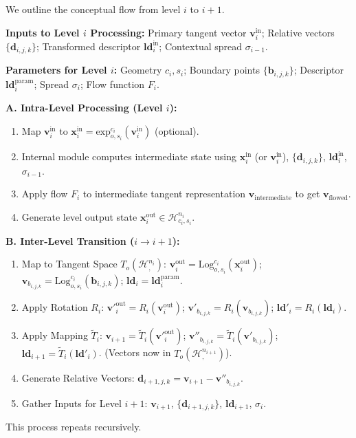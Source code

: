 \documentclass[11pt, twoside]{article} %
\newcommand{\HypSpaceCmd}[3]{\mathcal{H}^{#1}_{#2, #3}} %
\begin{document}
We outline the conceptual flow from level $i$ to $i+1$.

\textbf{Inputs to Level $i$ Processing:} Primary tangent vector $\mathbf{v}_i^{\text{in}}$; Relative vectors $\{\mathbf{d}_{i, j, k}\}$; Transformed descriptor $\mathbf{ld}_i^{\text{in}}$; Contextual spread $\sigma_{i-1}$.

\textbf{Parameters for Level $i$:} Geometry $c_i, s_i$; Boundary points $\{\mathbf{b}_{i,j,k}\}$; Descriptor $\mathbf{ld}_i^{\text{param}}$; Spread $\sigma_i$; Flow function $F_i$.

\textbf{A. Intra-Level Processing (Level $i$):}
\begin{enumerate}
    \item Map $\mathbf{v}_i^{\text{in}}$ to $\mathbf{x}_i^{\text{in}} = \text{exp}_{o,s_i}^{c_i}(\mathbf{v}_i^{\text{in}})$ (optional).
    \item Internal module computes intermediate state using $\mathbf{x}_i^{\text{in}}$ (or $\mathbf{v}_i^{\text{in}}$), $\{\mathbf{d}_{i, j, k}\}$, $\mathbf{ld}_i^{\text{in}}$, $\sigma_{i-1}$.
    \item Apply flow $F_i$ to intermediate tangent representation $\mathbf{v}_{\text{intermediate}}$ to get $\mathbf{v}_{\text{flowed}}$.
    \item Generate level output state $\mathbf{x}_i^{\text{out}} \in \HypSpaceCmd{n_i}{c_i}{s_i}$.
\end{enumerate}

\textbf{B. Inter-Level Transition ($i \rightarrow i+1$):}
\begin{enumerate}
    \item Map to Tangent Space $T_o(\HypSpaceCmd{n_i}{}{})$:
        $\mathbf{v}_i^{\text{out}} = \text{Log}_{o,s_i}^{c_i}(\mathbf{x}_i^{\text{out}})$;
        $\mathbf{v}_{b_{i,j,k}} = \text{Log}_{o,s_i}^{c_i}(\mathbf{b}_{i,j,k})$;
        $\mathbf{ld}_i = \mathbf{ld}_i^{\text{param}}$.
    \item Apply Rotation $R_i$:
        $\mathbf{v}'^{\text{out}}_i = R_i(\mathbf{v}_i^{\text{out}})$;
        $\mathbf{v}'_{b_{i,j,k}} = R_i(\mathbf{v}_{b_{i,j,k}})$;
        $\mathbf{ld}'_i = R_i(\mathbf{ld}_i)$.
    \item Apply Mapping $\tilde{T}_i$:
        $\mathbf{v}_{i+1} = \tilde{T}_i(\mathbf{v}'^{\text{out}}_i)$;
        $\mathbf{v}''_{b_{i,j,k}} = \tilde{T}_i(\mathbf{v}'_{b_{i,j,k}})$;
        $\mathbf{ld}_{i+1} = \tilde{T}_i(\mathbf{ld}'_i)$. (Vectors now in $T_o(\HypSpaceCmd{n_{i+1}}{}{})$).
    \item Generate Relative Vectors: $\mathbf{d}_{i+1, j, k} = \mathbf{v}_{i+1} - \mathbf{v}''_{b_{i,j,k}}$.
    \item Gather Inputs for Level $i+1$: $\mathbf{v}_{i+1}$, $\{\mathbf{d}_{i+1, j, k}\}$, $\mathbf{ld}_{i+1}$, $\sigma_i$.
\end{enumerate}
This process repeats recursively.
\end{document}
